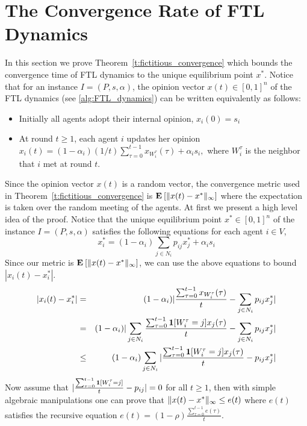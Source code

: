 \section{The Convergence Rate of FTL Dynamics}\label{s:fictitious_convergence}
In this section we prove Theorem~\ref{t:fictitious_convergence} which bounds
the convergence time of FTL dynamics to the unique equilibrium point $x^*$.
Notice that for an instance $I=(P,s,\alpha)$, the opinion vector $x(t) \in [0,1]^n$
of the FTL dynamics (see \ref{alg:FTL_dynamics}) can be written equivalently as follows:
\begin{itemize}
 \item Initially all agents adopt their internal opinion, $x_i(0)=s_i$
 \item At round $t \geq 1$, each agent $i$ updates her opinion
 \(
x_i(t)=(1-\alpha_i)(1/t)\sum_{\tau=0}^{t-1} x_{W_i^\tau}(\tau)+ \alpha_i s_i,
\)
where $W_i^\tau$ is the neighbor that $i$ met at round $t$.
\end{itemize}
Since the opinion vector $x(t)$ is a random vector,
the convergence metric used in Theorem~\ref{t:fictitious_convergence} is 
$\bm{\mathrm{E}}_{} \left[ \| x(t) - x^* \|_{\infty} \right]$ where the expectation is taken 
over the random meeting of the agents.
%
%
At first we present a high level idea of the proof.
Notice that the unique equilibrium point $x^* \in [0,1]^n$ of the
instance $I=(P,s,\alpha)$ satisfies the following equations
for each agent $i \in V$,
\[x_i^*= (1-\alpha_i)\sum_{j \in N_i}p_{ij}x_j^* + \alpha_is_i\]
Since our metric is $\bm{\mathrm{E}}_{} \left[ \| x(t)-x^* \|_{\infty} \right]$, we
can use the above equations to bound $|x_i(t)-x_i^*|$.
\begin{eqnarray*}
 |x_i(t)-x_i^*|
 &=& (1-\alpha_i)|\frac{\sum_{\tau=0}^{t-1} x_{W_i^\tau}(\tau)}{t}
 - \sum_{j \in N_i} p_{ij}x_j^*|\\
 &=& (1-\alpha_i)|\sum_{j \in N_i}\frac{\sum_{\tau=0}^{t-1} \bm{1}{\left[W_i^\tau=j\right]}x_j(\tau)}{t}-\sum_{j \in N_i} p_{ij}x_j^*|\\
 &\leq& (1-\alpha_i)\sum_{j \in N_i}|\frac{\sum_{\tau=0}^{t-1} \bm{1}{\left[W_i^\tau=j\right]}x_j(\tau)}{t}- p_{ij}x_j^*|
\end{eqnarray*}
Now assume that $|\frac{\sum_{\tau=0}^{t-1} \bm{1}{\left[W_i^{\tau}=j\right]}}{t}- p_{ij}| = 0$
for all $t\geq 1$, then with simple algebraic manipulations
one can prove that $\| x(t)-x^* \|_{\infty} \leq e(t)$ where $e(t)$
satisfies the recursive equation $e(t) = (1-\rho)\frac{\sum_{\tau=0}^{t-1}e(\tau)}{t}$.
